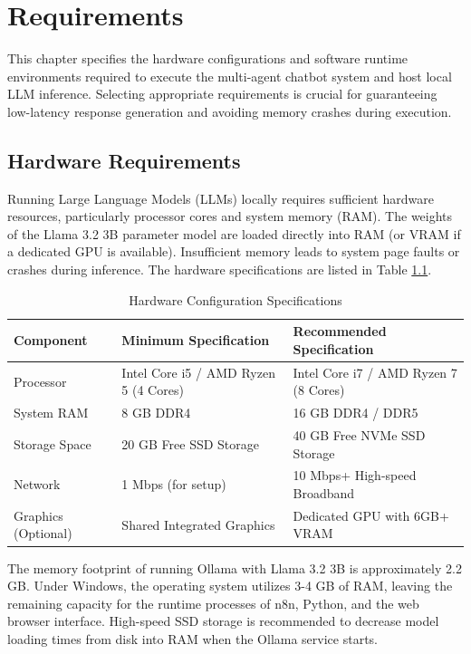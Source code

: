 \chapter{Requirements}
This chapter specifies the hardware configurations and software runtime environments required to execute the multi-agent chatbot system and host local LLM inference. Selecting appropriate requirements is crucial for guaranteeing low-latency response generation and avoiding memory crashes during execution.

\section{Hardware Requirements}
Running Large Language Models (LLMs) locally requires sufficient hardware resources, particularly processor cores and system memory (RAM). The weights of the Llama 3.2 3B parameter model are loaded directly into RAM (or VRAM if a dedicated GPU is available). Insufficient memory leads to system page faults or crashes during inference. The hardware specifications are listed in Table \ref{table:hardware_req}.

\begin{table}[H]
    \centering
    \caption{Hardware Configuration Specifications}
    \label{table:hardware_req}
    \begin{tabular}{lll}
        \toprule
        \textbf{Component} & \textbf{Minimum Specification} & \textbf{Recommended Specification} \\
        \midrule
        Processor & Intel Core i5 / AMD Ryzen 5 (4 Cores) & Intel Core i7 / AMD Ryzen 7 (8 Cores) \\
        System RAM & 8 GB DDR4 & 16 GB DDR4 / DDR5 \\
        Storage Space & 20 GB Free SSD Storage & 40 GB Free NVMe SSD Storage \\
        Network & 1 Mbps (for setup) & 10 Mbps+ High-speed Broadband \\
        Graphics (Optional) & Shared Integrated Graphics & Dedicated GPU with 6GB+ VRAM \\
        \bottomrule
    \end{tabular}
\end{table}

The memory footprint of running Ollama with Llama 3.2 3B is approximately 2.2 GB. Under Windows, the operating system utilizes 3-4 GB of RAM, leaving the remaining capacity for the runtime processes of n8n, Python, and the web browser interface. High-speed SSD storage is recommended to decrease model loading times from disk into RAM when the Ollama service starts.

